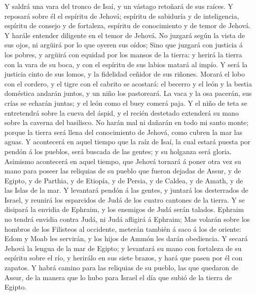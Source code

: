  Y saldrá una vara del tronco de Isaí, y un vástago
retoñará de sus raíces.  Y reposará sobre él el espíritu
de Jehová; espíritu de sabiduría y de inteligencia, espíritu de consejo
y de fortaleza, espíritu de conocimiento y de temor de Jehová.
 Y harále entender diligente en el temor de Jehová. No
juzgará según la vista de sus ojos, ni argüirá por lo que oyeren sus
oídos;  Sino que juzgará con justicia á los pobres, y
argüirá con equidad por los mansos de la tierra: y herirá la tierra con
la vara de su boca, y con el espíritu de sus labios matará al impío.
 Y será la justicia cinto de sus lomos, y la fidelidad
ceñidor de sus riñones.  Morará el lobo con el cordero, y
el tigre con el cabrito se acostará: el becerro y el león y la bestia
doméstica andarán juntos, y un niño los pastoreará.  La
vaca y la osa pacerán, sus crías se echarán juntas; y el león como el
buey comerá paja.  Y el niño de teta se entretendrá sobre
la cueva del áspid, y el recién destetado extenderá su mano sobre la
caverna del basilisco.  No harán mal ni dañarán en todo mi
santo monte; porque la tierra será llena del conocimiento de Jehová,
como cubren la mar las aguas.  Y acontecerá en aquel
tiempo que la raíz de Isaí, la cual estará puesta por pendón á los
pueblos, será buscada de las gentes; y su holganza será gloria.
 Asimismo acontecerá en aquel tiempo, que Jehová tornará
á poner otra vez su mano para poseer las reliquias de su pueblo que
fueron dejadas de Assur, y de Egipto, y de Parthia, y de Etiopía, y de
Persia, y de Caldea, y de Amath, y de las Islas de la mar.
 Y levantará pendón á las gentes, y juntará los
desterrados de Israel, y reunirá los esparcidos de Judá de los cuatro
cantones de la tierra.  Y se disipará la envidia de
Ephraim, y los enemigos de Judá serán talados. Ephraim no tendrá envidia
contra Judá, ni Judá afligirá á Ephraim;  Mas volarán
sobre los hombros de los Filisteos al occidente, meterán también á saco
á los de oriente: Edom y Moab les servirán, y los hijos de Ammón les
darán obediencia.  Y secará Jehová la lengua de la mar de
Egipto; y levantará su mano con fortaleza de su espíritu sobre el río, y
herirálo en sus siete brazos, y hará que pasen por él con zapatos.
 Y habrá camino para las reliquias de su pueblo, las que
quedaron de Assur, de la manera que lo hubo para Israel el día que subió
de la tierra de Egipto.

